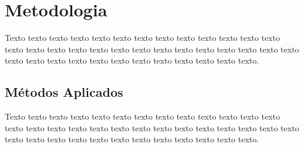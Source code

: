 \chapter{Metodologia}
\label{cap:metodologia}

Texto texto texto texto texto texto texto texto texto texto texto texto texto texto texto texto texto texto texto texto texto texto texto texto texto texto texto texto texto texto texto texto texto texto texto texto texto texto texto.

\section{Métodos Aplicados}
\label{sec:metodos-aplicados}

Texto texto texto texto texto texto texto texto texto texto texto texto texto texto texto texto texto texto texto texto texto texto texto texto texto texto texto texto texto texto texto texto texto texto texto texto texto texto texto.

